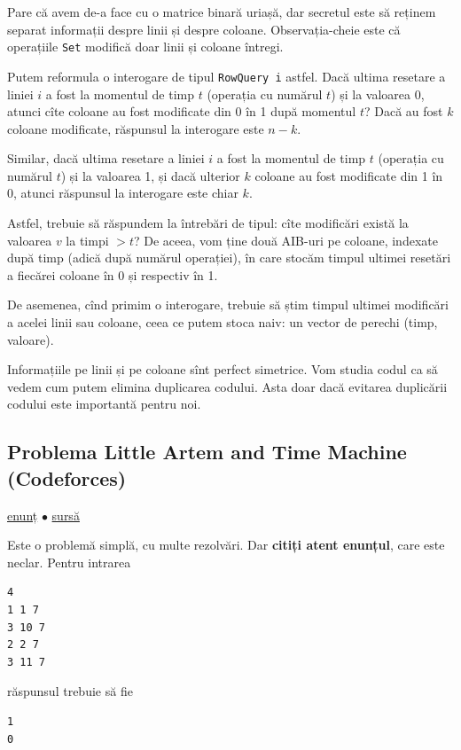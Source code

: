 \documentclass[../main.tex]{subfiles}
\begin{document}
Pare că avem de-a face cu o matrice binară uriașă, dar secretul este să reținem separat informații despre linii și despre coloane. Observația-cheie este că operațiile \texttt{Set} modifică doar linii și coloane întregi.

Putem reformula o interogare de tipul \texttt{RowQuery i} astfel. Dacă ultima resetare a liniei $i$ a fost la momentul de timp $t$ (operația cu numărul $t$) și la valoarea 0, atunci cîte coloane au fost modificate din 0 în 1 după momentul $t$? Dacă au fost $k$ coloane modificate, răspunsul la interogare este $n-k$.

Similar, dacă ultima resetare a liniei $i$ a fost la momentul de timp $t$ (operația cu numărul $t$) și la valoarea 1, și dacă ulterior $k$ coloane au fost modificate din 1 în 0, atunci răspunsul la interogare este chiar $k$.

Astfel, trebuie să răspundem la întrebări de tipul: cîte modificări există la valoarea $v$ la timpi $> t$? De aceea, vom ține două AIB-uri pe coloane, indexate după timp (adică după numărul operației), în care stocăm timpul ultimei resetări a fiecărei coloane în 0 și respectiv în 1.

De asemenea, cînd primim o interogare, trebuie să știm timpul ultimei modificări a acelei linii sau coloane, ceea ce putem stoca naiv: un vector de perechi (timp, valoare).

Informațiile pe linii și pe coloane sînt perfect simetrice. Vom studia codul ca să vedem cum putem elimina duplicarea codului. Asta doar dacă evitarea duplicării codului este importantă pentru noi. 

\subsection{Problema Little Artem and Time Machine (Codeforces)}
\label{problem:little-artem-and-time-machine}

\href{https://codeforces.com/contest/669/problem/E}{enunț}
$\bullet$
\hyperref[code:little-artem-and-time-machine]{sursă}

Este o problemă simplă, cu multe rezolvări. Dar \textbf{citiți atent enunțul}, care este neclar. Pentru intrarea

\begin{verbatim}
4
1 1 7
3 10 7
2 2 7
3 11 7
\end{verbatim}

răspunsul trebuie să fie

\begin{verbatim}
1
0
\end{verbatim}
\end{document}
